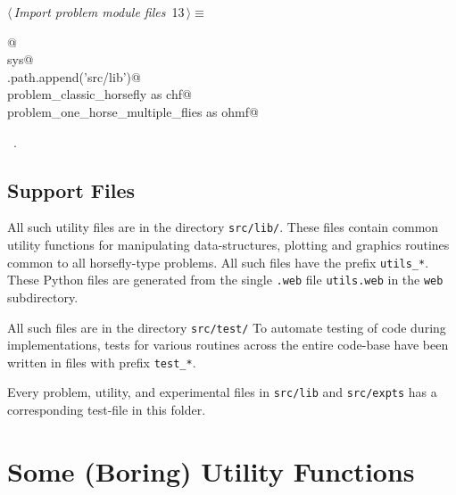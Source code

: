 \documentclass[11.5pt]{report}
\begin{document}
\begin{flushleft} \small
\begin{minipage}{\linewidth}\label{scrap3}\raggedright\small
{} $\langle\,${\itshape Import problem module files}\nobreak\ {\footnotesize {13}}$\,\rangle\equiv$
\vspace{-1ex}
\begin{list}{}{} \item
\mbox{}\verb@   @\\
\mbox{}\verb@import sys@\\
\mbox{}\verb@sys.path.append('src/lib')@\\
\mbox{}\verb@import problem_classic_horsefly as chf@\\
\mbox{}\verb@import problem_one_horse_multiple_flies as ohmf@\\
\mbox{}\verb@@{\NWsep}
\end{list}
\vspace{-1.5ex}
\footnotesize
\begin{list}{}{\setlength{\itemsep}{-\parsep}\setlength{\itemindent}{-\leftmargin}}
\item \NWtxtMacroRefIn\ .

\item{}
\end{list}
\end{minipage}\vspace{4ex}
\end{flushleft}
\section{Support Files}

\begin{alphalist}
\item {}  All such utility files are in the directory \texttt{src/lib/}. 
 These files contain common utility functions  for manipulating data-structures, plotting 
 and graphics routines common to all horsefly-type problems. All such files have the prefix 
 \verb|utils_*|. These Python files are generated from the single \verb|.web| file \verb|utils.web| 
 in the \verb|web| subdirectory.

\item {} All such files are in the directory \texttt{src/test/}
 To automate testing of code during implementations, tests for various 
 routines across the entire code-base have been written in files with prefix
 \verb|test_*|.  
 
 Every problem, utility, and experimental files in \verb|src/lib| and \verb|src/expts| 
 has a corresponding test-file in this folder. 
\end{alphalist}\chapter{Some (Boring) Utility Functions}
\label{chap:utility-functions}
\end{document}

